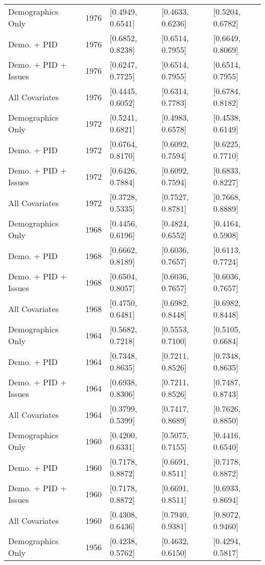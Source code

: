 \begin{longtable}{lrlll}
  Demographics Only & 1976 & [0.4949, 0.6541] & [0.4633, 0.6236] & [0.5204, 0.6782] \\ 
  Demo. + PID & 1976 & [0.6852, 0.8238] & [0.6514, 0.7955] & [0.6649, 0.8069] \\ 
  Demo. + PID + Issues & 1976 & [0.6247, 0.7725] & [0.6514, 0.7955] & [0.6514, 0.7955] \\ 
  All Covariates & 1976 & [0.4445, 0.6052] & [0.6314, 0.7783] & [0.6784, 0.8182] \\ 
  Demographics Only & 1972 & [0.5241, 0.6821] & [0.4983, 0.6578] & [0.4538, 0.6149] \\ 
  Demo. + PID & 1972 & [0.6764, 0.8170] & [0.6092, 0.7594] & [0.6225, 0.7710] \\ 
  Demo. + PID + Issues & 1972 & [0.6426, 0.7884] & [0.6092, 0.7594] & [0.6833, 0.8227] \\ 
  All Covariates & 1972 & [0.3728, 0.5335] & [0.7527, 0.8781] & [0.7668, 0.8889] \\ 
  Demographics Only & 1968 & [0.4456, 0.6196] & [0.4824, 0.6552] & [0.4164, 0.5908] \\ 
  Demo. + PID & 1968 & [0.6662, 0.8189] & [0.6036, 0.7657] & [0.6113, 0.7724] \\ 
  Demo. + PID + Issues & 1968 & [0.6504, 0.8057] & [0.6036, 0.7657] & [0.6036, 0.7657] \\ 
  All Covariates & 1968 & [0.4750, 0.6481] & [0.6982, 0.8448] & [0.6982, 0.8448] \\ 
  Demographics Only & 1964 & [0.5682, 0.7218] & [0.5553, 0.7100] & [0.5105, 0.6684] \\ 
  Demo. + PID & 1964 & [0.7348, 0.8635] & [0.7211, 0.8526] & [0.7348, 0.8635] \\ 
  Demo. + PID + Issues & 1964 & [0.6938, 0.8306] & [0.7211, 0.8526] & [0.7487, 0.8743] \\ 
  All Covariates & 1964 & [0.3799, 0.5399] & [0.7417, 0.8689] & [0.7626, 0.8850] \\ 
  Demographics Only & 1960 & [0.4200, 0.6331] & [0.5075, 0.7155] & [0.4416, 0.6540] \\ 
  Demo. + PID & 1960 & [0.7178, 0.8872] & [0.6691, 0.8511] & [0.7178, 0.8872] \\ 
  Demo. + PID + Issues & 1960 & [0.7178, 0.8872] & [0.6691, 0.8511] & [0.6933, 0.8694] \\ 
  All Covariates & 1960 & [0.4308, 0.6436] & [0.7940, 0.9381] & [0.8072, 0.9460] \\ 
  Demographics Only & 1956 & [0.4238, 0.5762] & [0.4632, 0.6150] & [0.4294, 0.5817] \\ 

\end{longtable}
